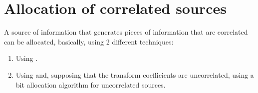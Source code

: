   
\section{Allocation of correlated sources}
A source of information that generates pieces of information that are
correlated can be allocated, basically, using 2 different techniques:
\begin{enumerate}
\item Using .
\item Using  and, supposing
  that the transform coefficients are uncorrelated, using a bit
  allocation algorithm for uncorrelated sources.
\end{enumerate}



